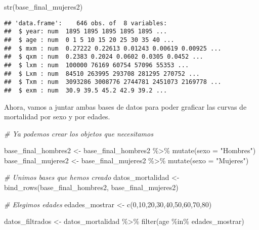 \documentclass[
]{article}
\newenvironment{Shaded}{\begin{snugshade}}{\end{snugshade}}
\newcommand{\AttributeTok}[1]{\textcolor[rgb]{0.77,0.63,0.00}{#1}}
\newcommand{\CommentTok}[1]{\textcolor[rgb]{0.56,0.35,0.01}{\textit{#1}}}
\newcommand{\DecValTok}[1]{\textcolor[rgb]{0.00,0.00,0.81}{#1}}
\newcommand{\FunctionTok}[1]{\textcolor[rgb]{0.00,0.00,0.00}{#1}}
\newcommand{\NormalTok}[1]{#1}
\newcommand{\OtherTok}[1]{\textcolor[rgb]{0.56,0.35,0.01}{#1}}
\newcommand{\SpecialCharTok}[1]{\textcolor[rgb]{0.00,0.00,0.00}{#1}}
\newcommand{\StringTok}[1]{\textcolor[rgb]{0.31,0.60,0.02}{#1}}
\begin{document}
\begin{Shaded}
\begin{Highlighting}[]
\FunctionTok{str}\NormalTok{(base\_final\_mujeres2)}
\end{Highlighting}
\end{Shaded}

\begin{verbatim}
## 'data.frame':    646 obs. of  8 variables:
##  $ year: num  1895 1895 1895 1895 1895 ...
##  $ age : num  0 1 5 10 15 20 25 30 35 40 ...
##  $ mxm : num  0.27222 0.22613 0.01243 0.00619 0.00925 ...
##  $ qxm : num  0.2383 0.2024 0.0602 0.0305 0.0452 ...
##  $ lxm : num  100000 76169 60754 57096 55353 ...
##  $ Lxm : num  84510 263995 293708 281295 270752 ...
##  $ Txm : num  3093286 3008776 2744781 2451073 2169778 ...
##  $ exm : num  30.9 39.5 45.2 42.9 39.2 ...
\end{verbatim}

Ahora, vamos a juntar ambas bases de datos para poder graficar las
curvas de mortalidad por sexo y por edades.

\begin{Shaded}
\begin{Highlighting}[]
\CommentTok{\# Ya podemos crear los objetos que necesitamos }

\NormalTok{base\_final\_hombres2 }\OtherTok{\textless{}{-}}\NormalTok{ base\_final\_hombres2 }\SpecialCharTok{\%\textgreater{}\%} \FunctionTok{mutate}\NormalTok{(}\AttributeTok{sexo =} \StringTok{"Hombres"}\NormalTok{)}
\NormalTok{base\_final\_mujeres2 }\OtherTok{\textless{}{-}}\NormalTok{ base\_final\_mujeres2 }\SpecialCharTok{\%\textgreater{}\%} \FunctionTok{mutate}\NormalTok{(}\AttributeTok{sexo =} \StringTok{"Mujeres"}\NormalTok{)}

\CommentTok{\# Unimos bases que hemos creado }
\NormalTok{datos\_mortalidad }\OtherTok{\textless{}{-}} \FunctionTok{bind\_rows}\NormalTok{(base\_final\_hombres2, base\_final\_mujeres2)}

\CommentTok{\# Elegimos edades}
\NormalTok{edades\_mostrar }\OtherTok{\textless{}{-}} \FunctionTok{c}\NormalTok{(}\DecValTok{0}\NormalTok{,}\DecValTok{10}\NormalTok{,}\DecValTok{20}\NormalTok{,}\DecValTok{30}\NormalTok{,}\DecValTok{40}\NormalTok{,}\DecValTok{50}\NormalTok{,}\DecValTok{60}\NormalTok{,}\DecValTok{70}\NormalTok{,}\DecValTok{80}\NormalTok{)}

\NormalTok{datos\_filtrados }\OtherTok{\textless{}{-}}\NormalTok{ datos\_mortalidad }\SpecialCharTok{\%\textgreater{}\%} \FunctionTok{filter}\NormalTok{(age }\SpecialCharTok{\%in\%}\NormalTok{ edades\_mostrar)}
\end{Highlighting}
\end{Shaded}
\end{document}
